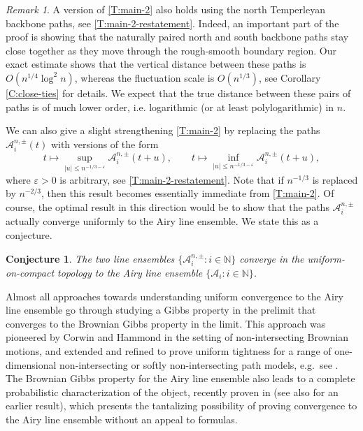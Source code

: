 \documentclass[11pt,twoside]{amsart}
\theoremstyle{plain}
\newtheorem{conj}[thm]{Conjecture}
\numberwithin{quest}{section}
\theoremstyle{remark}
\newtheorem{rem}{Remark}
\numberwithin{rem}{section}
\theoremstyle{definition}
\newcommand{\eps}{\varepsilon}
\newcommand{\N}{\mathbb{N}}
\newcommand{\cA}{\mathcal{A}}
\begin{document}
	\begin{rem}
		\label{R:variants-main-thm-2}
		A version of \cref{T:main-2} also holds using the north Temperleyan backbone paths, see \cref{T:main-2-restatement}. Indeed, an important part of the proof is showing that the naturally paired north and south backbone paths stay close together as they move through the rough-smooth boundary region. Our exact estimate shows that the vertical distance between these paths is $O(n^{1/4} \log^2 n)$, whereas the fluctuation scale is $O(n^{1/3})$, see Corollary \ref{C:close-ties} for details. We expect that the true distance between these pairs of paths is of much lower order, i.e. logarithmic (or at least polylogarithmic) in $n$. 
		
		We can also give a slight strengthening \cref{T:main-2} by replacing the paths $\cA_i^{n, \pm}(t)$ with versions of the form
		$$
		t \mapsto \sup_{|u| \le n^{-1/3 - \eps}} \cA_i^{n, \pm}(t + u), \qquad t \mapsto \inf_{|u| \le n^{-1/3 - \eps}} \cA_i^{n, \pm}(t + u),
		$$
		where $\eps > 0$ is arbitrary, see \cref{T:main-2-restatement}. Note that if $n^{-1/3}$ is replaced by $n^{-2/3}$, then this result becomes essentially immediate from \cref{T:main-2}. Of course, the optimal result in this direction would be to show that the paths $\cA_i^{n, \pm}$ actually converge uniformly to the Airy line ensemble. We state this as a conjecture.
	\end{rem}
	
	\begin{conj}
		\label{conj:Gibbs}
		The two line ensembles $\{\cA_i^{n, \pm} : i \in \N\}$ converge in the uniform-on-compact topology to the  Airy line ensemble $\{\cA_i : i \in \N\}$. 
	\end{conj}
	
	Almost all approaches towards understanding uniform convergence to the Airy line ensemble go through studying a Gibbs property in the prelimit that converges to the Brownian Gibbs property in the limit. This approach was pioneered by Corwin and Hammond \cite{CH11} in the setting of non-intersecting Brownian motions, and extended and refined to prove uniform tightness for a range of one-dimensional non-intersecting or softly non-intersecting path models, e.g.\ see \cite{corwin2016kpz, dauvergne2023uniform, wu2023convergence, barraquand2023spatial, dimitrov2021tightness, corwin2018transversal, aggarwal2024scaling, serio2023tightness, das2025half, dimitrov2025uniform}. The Brownian Gibbs property for the Airy line ensemble also leads to a complete probabilistic characterization of the object, recently proven in \cite{aggarwal2023strong} (see also \cite{dimitrov2021characterization} for an earlier result), which presents the tantalizing possibility of proving convergence to the Airy line ensemble without an appeal to formulas.
    
\end{document}
